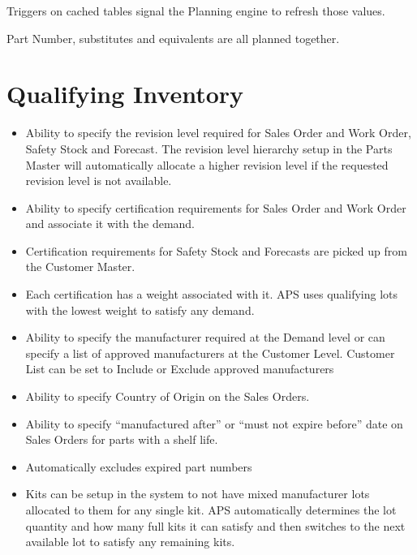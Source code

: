 \documentclass[letterpaper,10pt,english]{sphinxmanual}
\begin{document}
Triggers on cached tables signal the Planning engine to refresh those
values.

Part Number, substitutes and equivalents are all planned together.


\section{Qualifying Inventory}
\label{APS/Introduction:qualifying-inventory}\begin{itemize}
\item {} 
Ability to specify the revision level required for Sales Order and
Work Order, Safety Stock and Forecast. The revision level hierarchy
setup in the Parts Master will automatically allocate a higher
revision level if the requested revision level is not available.

\item {} 
Ability to specify certification requirements for Sales Order and
Work Order and associate it with the demand.

\item {} 
Certification requirements for Safety Stock and Forecasts are picked
up from the Customer Master.

\item {} 
Each certification has a weight associated with it. APS uses
qualifying lots with the lowest weight to satisfy any demand.

\item {} 
Ability to specify the manufacturer required at the Demand level or
can specify a list of approved manufacturers at the Customer Level.
Customer List can be set to Include or Exclude approved manufacturers

\item {} 
Ability to specify Country of Origin on the Sales Orders.

\item {} 
Ability to specify “manufactured after” or “must not expire before”
date on Sales Orders for parts with a shelf life.

\item {} 
Automatically excludes expired part numbers

\item {} 
Kits can be setup in the system to not have mixed manufacturer lots
allocated to them for any single kit. APS automatically determines
the lot quantity and how many full kits it can satisfy and then
switches to the next available lot to satisfy any remaining kits.

\end{itemize}
\end{document}
